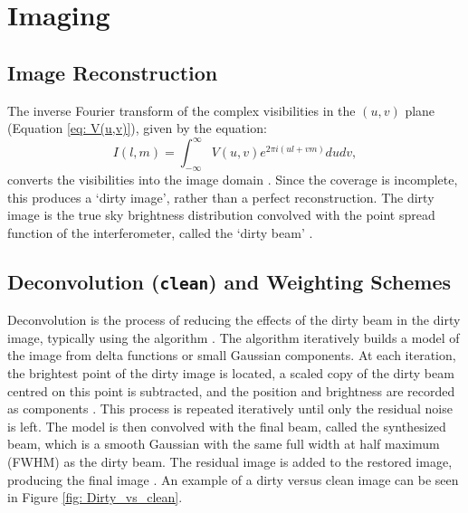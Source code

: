\section{Imaging}


\subsection{Image Reconstruction}

The inverse Fourier transform of the complex visibilities in the $(u,v)$ plane (Equation \ref{eq: V(u,v)}), given by the equation:
\begin{equation}
    I(l,m) = \int_{-\infty}^\infty V(u,v) e^{2\pi i(ul+vm)}dudv,
    \label{eq: I(l, m)}
\end{equation}
\noindent converts the visibilities into the image domain \citep{Thompson}. Since the \uv coverage is incomplete, this produces a `dirty image', rather than a perfect reconstruction. The dirty image is the true sky brightness distribution convolved with the point spread function of the interferometer, called the `dirty beam' \citep{Marvil2026}.




\subsection{Deconvolution (\texttt{clean}) and Weighting Schemes}
\label{sec: inter_weighting}


Deconvolution is the process of reducing the effects of the dirty beam in the dirty image, typically using the algorithm \clean \citep{Thompson, Marvil2026}. The \clean algorithm iteratively builds a model of the image from delta functions or small Gaussian components. At each iteration, the brightest point of the dirty image is located, a scaled copy of the dirty beam centred on this point is subtracted, and the position and brightness are recorded as \clean components \citep{Monnier}. This process is repeated iteratively until only the residual noise is left. The \clean model is then convolved with the final \clean beam, called the synthesized beam, which is a smooth Gaussian with the same full width at half maximum (FWHM) as the dirty beam. The residual image is added to the restored image, producing the final \clean image \citep{Thompson}. An example of a dirty versus clean image can be seen in Figure \ref{fig: Dirty_vs_clean}. 


